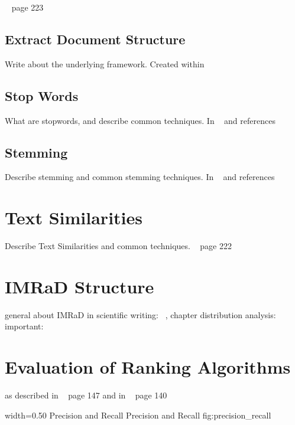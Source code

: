 ~\cite{ModernInvormationRetrieval1999} page 223

\subsection{Extract Document Structure}
\label{subsec:extract_document_structure}

Write about the underlying framework. Created within ~\cite{KlampflGJK14}

\subsection{Stop Words}
\label{subsec:stop_words}

What are stopwords, and describe common techniques. In ~\cite{Vijayarani2015} and references

\subsection{Stemming}
\label{subsec:stemming}

Describe stemming and common stemming techniques. In ~\cite{Vijayarani2015} and references

\section{Text Similarities}
\label{sec:text_similarities}

Describe Text Similarities and common techniques. ~\cite{ModernInvormationRetrieval1999} page 222

\section{IMRaD Structure}
\label{sec:imrad_structure}

general about IMRaD in scientific writing: ~\cite{robert1989}, chapter distribution analysis: ~\cite{bertin2013} important: ~\cite{Sollaci-The-2004}

\section{Evaluation of Ranking Algorithms}
\label{sec:evaluation_of_ranking_algorithms}

as described in ~\cite{manning2008} page 147 and in ~\cite{ModernInvormationRetrieval1999} page 140

      {width=0.50\textwidth}
      {Precision and Recall}
      {Precision and Recall}
      {fig:precision_recall}

